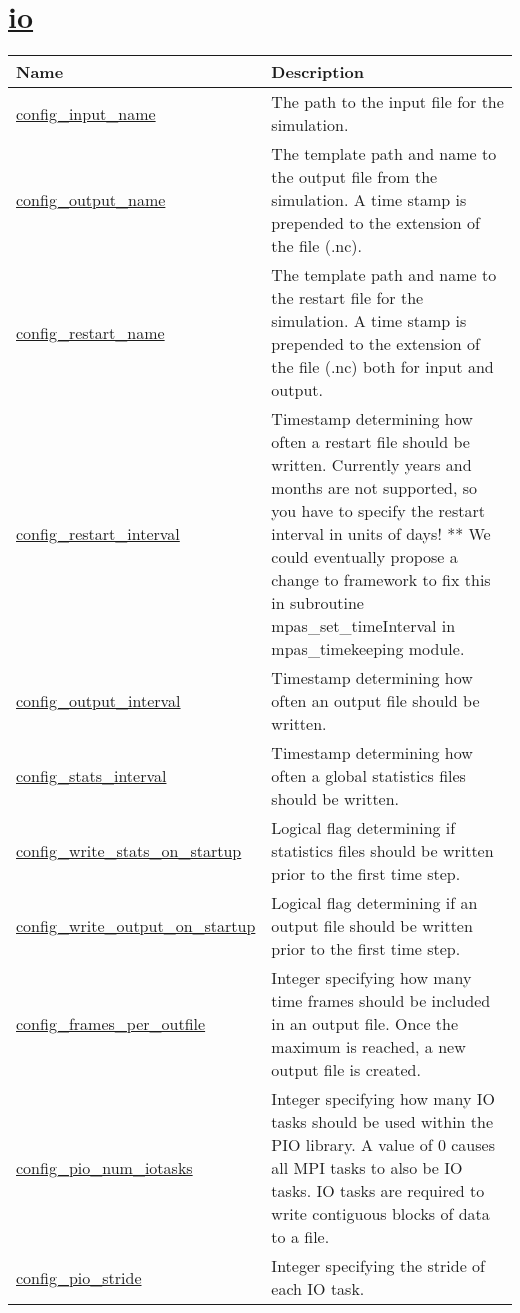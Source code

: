 \section[io]{\hyperref[sec:nm_sec_io]{io}}
\label{sec:nm_tab_io}

{\small
\begin{center}
\begin{longtable}{| p{2.0in} || p{4.0in} |}
	\hline
	{\bf Name} & {\bf Description} \\
	\hline
	\hline
	\hyperref[subsec:nm_sec_config_input_name]{config\_input\_name} & The path to the input file for the simulation. \\
	\hline
	\hyperref[subsec:nm_sec_config_output_name]{config\_output\_name} & The template path and name to the output file from the simulation. A time stamp is prepended to the extension of the file (.nc). \\
	\hline
	\hyperref[subsec:nm_sec_config_restart_name]{config\_restart\_name} & The template path and name to the restart file for the simulation. A time stamp is prepended to the extension of the file (.nc) both for input and output. \\
	\hline
	\hyperref[subsec:nm_sec_config_restart_interval]{config\_restart\_interval} & Timestamp determining how often a restart file should be written.  Currently years and months are not supported, so you have to specify the restart interval in units of days! **  We could eventually propose a change to framework to fix this in subroutine mpas\_set\_timeInterval in mpas\_timekeeping module. \\
	\hline
	\hyperref[subsec:nm_sec_config_output_interval]{config\_output\_interval} & Timestamp determining how often an output file should be written. \\
	\hline
	\hyperref[subsec:nm_sec_config_stats_interval]{config\_stats\_interval} & Timestamp determining how often a global statistics files should be written. \\
	\hline
	\hyperref[subsec:nm_sec_config_write_stats_on_startup]{config\_write\_stats\_on\_startup} & Logical flag determining if statistics files should be written prior to the first time step. \\
	\hline
	\hyperref[subsec:nm_sec_config_write_output_on_startup]{config\_write\_output\_on\_startup} & Logical flag determining if an output file should be written prior to the first time step. \\
	\hline
	\hyperref[subsec:nm_sec_config_frames_per_outfile]{config\_frames\_per\_outfile} & Integer specifying how many time frames should be included in an output file. Once the maximum is reached, a new output file is created. \\
	\hline
	\hyperref[subsec:nm_sec_config_pio_num_iotasks]{config\_pio\_num\_iotasks} & Integer specifying how many IO tasks should be used within the PIO library. A value of 0 causes all MPI tasks to also be IO tasks. IO tasks are required to write contiguous blocks of data to a file. \\
	\hline
	\hyperref[subsec:nm_sec_config_pio_stride]{config\_pio\_stride} & Integer specifying the stride of each IO task. \\
	\hline
\end{longtable}
\end{center}
}

